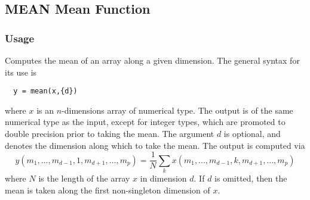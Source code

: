 %
%
%
\subsection{MEAN Mean Function}
\subsubsection{Usage}
Computes the mean of an array along a given dimension.  The general
syntax for its use is
\begin{verbatim}
  y = mean(x,{d})
\end{verbatim}
where $x$ is an $n$-dimensions array of numerical type.
The output is of the same numerical type as the input, except for 
integer types, which are promoted to double precision prior to taking
the mean.  The argument $d$ is optional, and denotes the dimension 
along which to take the mean.  The output is computed via
\[
y(m_1,\ldots,m_{d-1},1,m_{d+1},\ldots,m_{p}) = \frac{1}{N}
\sum_{k} x(m_1,\ldots,m_{d-1},k,m_{d+1},\ldots,m_{p})
\]
where $N$ is the length of the array $x$ in dimension $d$.
If $d$ is omitted, then the mean is taken along the 
first non-singleton dimension of $x$. 
